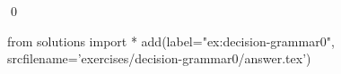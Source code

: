 
\begin{ex} 
  \label{ex:decision-grammar0}
  
  \qed
\end{ex} 
\begin{python0}
from solutions import *
add(label="ex:decision-grammar0",
    srcfilename='exercises/decision-grammar0/answer.tex') 
\end{python0}
